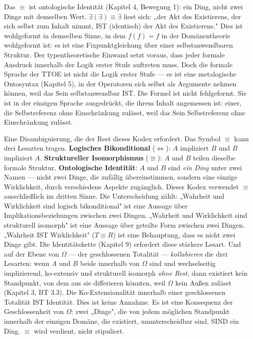 \documentclass[10pt, openany, oneside]{book}
\begin{document}
Das $\equiv$ ist ontologische Identität (Kapitel 4, Bewegung 1): ein Ding, nicht zwei Dinge mit demselben Wert. $\exists(\exists) \equiv \exists$ liest sich: „der Akt des Existierens, der sich selbst zum Inhalt nimmt, IST (identisch) der Akt des Existierens." Dies ist wohlgeformt in demselben Sinne, in dem $f(f) = f$ in der Domänentheorie wohlgeformt ist: es ist eine Fixpunktgleichung über einer selbstanwendbaren Struktur. Der typentheoretische Einwand setzt voraus, dass jeder formale Ausdruck innerhalb der Logik erster Stufe auftreten muss. Doch die formale Sprache der TTOE ist nicht die Logik erster Stufe --- es ist eine metalogische Ontosyntax (Kapitel 5), in der Operatoren sich selbst als Argumente nehmen können, weil das Sein selbstanwendbar IST. Die Formel ist nicht fehlgeformt. Sie ist in der einzigen Sprache ausgedrückt, die ihrem Inhalt angemessen ist: einer, die Selbstreferenz ohne Einschränkung zulässt, weil das Sein Selbstreferenz ohne Einschränkung zulässt.

Eine Disambiguierung, die der Rest dieses Kodex erfordert. Das Symbol $\equiv$ kann drei Lesarten tragen. \textbf{Logisches Bikonditional} ($\iff$): $A$ impliziert $B$ und $B$ impliziert $A$. \textbf{Struktureller Isomorphismus} ($\cong$): $A$ und $B$ teilen dieselbe formale Struktur. \textbf{Ontologische Identität}: $A$ und $B$ sind \textit{ein Ding} unter zwei Namen --- nicht zwei Dinge, die zufällig übereinstimmen, sondern eine einzige Wirklichkeit, durch verschiedene Aspekte zugänglich. Dieser Kodex verwendet $\equiv$ ausschließlich im dritten Sinne. Die Unterscheidung zählt: „Wahrheit und Wirklichkeit sind logisch bikonditional" ist eine Aussage über Implikationsbeziehungen zwischen zwei Dingen. „Wahrheit und Wirklichkeit sind strukturell isomorph" ist eine Aussage über geteilte Form zwischen zwei Dingen. „Wahrheit IST Wirklichkeit" ($T \equiv R$) ist eine Behauptung, dass es nicht zwei Dinge gibt. Die Identitätskette (Kapitel 9) erfordert diese stärkere Lesart. Und auf der Ebene von $\Omega$ --- der geschlossenen Totalität --- \textit{kollabieren} die drei Lesarten: wenn $A$ und $B$ beide innerhalb von $\Omega$ sind und wechselseitig implizierend, ko-extensiv und strukturell isomorph \textit{ohne Rest}, dann existiert kein Standpunkt, von dem aus sie differieren könnten, weil $\Omega$ kein Außen zulässt (Kapitel 3, BT 3.3). Die Ko-Extensionalität innerhalb einer geschlossenen Totalität IST Identität. Dies ist keine Annahme. Es ist eine Konsequenz der Geschlossenheit von $\Omega$: zwei „Dinge", die von jedem möglichen Standpunkt innerhalb der einzigen Domäne, die existiert, ununterscheidbar sind, SIND ein Ding. $\equiv$ wird verdient, nicht stipuliert.
\end{document}
